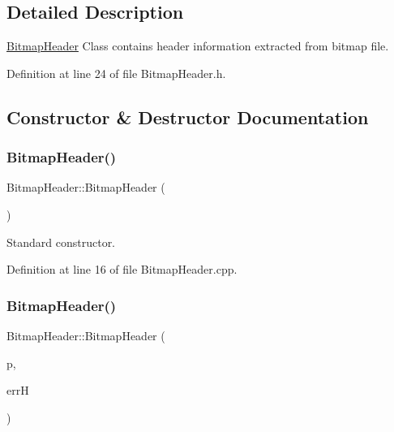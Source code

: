 \subsection{Detailed Description}
\mbox{\hyperlink{classBitmapHeader}{Bitmap\+Header}} Class contains header information extracted from bitmap file. 

Definition at line 24 of file Bitmap\+Header.\+h.



\subsection{Constructor \& Destructor Documentation}
\mbox{\label{classBitmapHeader_a216e4a8485db7865be70c996f37e4c7d}} 
\subsubsection{\texorpdfstring{BitmapHeader()}{BitmapHeader()}\hspace{0.1cm}{\footnotesize\ttfamily [1/3]}}
{\footnotesize\ttfamily Bitmap\+Header\+::\+Bitmap\+Header (\begin{DoxyParamCaption}{ }\end{DoxyParamCaption})}



Standard constructor. 



Definition at line 16 of file Bitmap\+Header.\+cpp.

\mbox{\label{classBitmapHeader_a2cf57f049eae7d2ee93d5749d678aca5}} 
\subsubsection{\texorpdfstring{BitmapHeader()}{BitmapHeader()}\hspace{0.1cm}{\footnotesize\ttfamily [2/3]}}
{\footnotesize\ttfamily Bitmap\+Header\+::\+Bitmap\+Header (\begin{DoxyParamCaption}\item[{std\+::string}]{p,  }\item[{\mbox{\hyperlink{classErrorHandler}{Error\+Handler}} $\ast$}]{errH }\end{DoxyParamCaption})}



